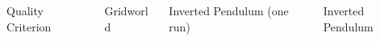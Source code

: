\documentclass[xcolor=x11names,12pt]{beamer}
\begin{document}
\begin{frame}
\begin{columns}
\begin{column}{.48\textwidth}
    \end{column}
  \end{columns}
\vfill
  \begin{columns}
    \begin{column}{.23\textwidth}
      \begin{block}{Quality Criterion}
        \fontsize{11pt}{11pt}\selectfont
        \resizebox{.9\columnwidth}{!}{}
      \end{block}
    \end{column}
    \begin{column}{.23\textwidth}
      \begin{block}{Gridworld}
        \fontsize{11pt}{11pt}\selectfont
        \resizebox{.9\columnwidth}{!}{}
      \end{block}
    \end{column}
    \begin{column}{.23\textwidth}
      \begin{block}{Inverted Pendulum (one run)}
        \fontsize{11pt}{11pt}\selectfont
        \resizebox{.9\columnwidth}{!}{}
      \end{block}
    \end{column}
    \begin{column}{.23\textwidth}
      \begin{block}{Inverted Pendulum}
        \fontsize{11pt}{11pt}\selectfont
        \resizebox{.9\columnwidth}{!}{}
      \end{block}
    \end{column}
  \end{columns}



\end{frame}
\end{document}
